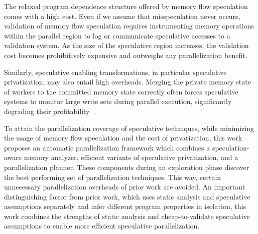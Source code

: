 

%

The relaxed program dependence structure offered by memory flow
speculation comes with a high cost.  Even if we assume that
misspeculation never occurs, validation of memory flow speculation
requires instrumenting memory operations within the parallel region to
log or communicate speculative accesses to a validation system. As the
size of the speculative region increases, the validation cost becomes
prohibitively expensive and outweighs any parallelization benefit.

Similarly, speculative enabling transformations,
in particular speculative privatization, may also entail high
overheads.  Merging the private memory state of workers to the
committed memory state correctly often forces speculative systems to monitor
large write sets during parallel execution, significantly degrading
their profitability~\cite{kim:12:cgo,johnson:12:pldi,LRPD?}.

To attain the parallelization coverage of speculative techniques,
while minimizing the usage of memory flow speculation and the cost of
privatization,
%
this work proposes an automatic parallelization framework which
combines a speculation-aware memory analyzer, efficient variants of
speculative privatization, and a parallelization planner. These
components during an exploration phase discover the best performing
set of parallelization techniques. This way, certain unnecessary
parallelization overheads of prior work are avoided.
%
An important distinguishing factor from prior work, which uses static
analysis and speculative assumptions separately and infer
different program properties in isolation, this work combines
the strengths of static analysis and cheap-to-validate speculative
assumptions to enable more efficient speculative parallelization.

